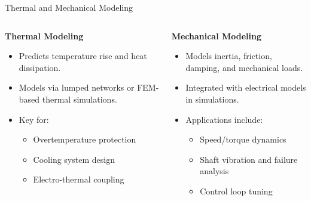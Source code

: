\begin{frame}{Thermal and Mechanical Modeling}
    \begin{columns}
        \begin{column}{0.5\textwidth}
            \textbf{Thermal Modeling}
            \begin{itemize}
                \item Predicts temperature rise and heat dissipation.
                \item Models via lumped networks or FEM-based thermal simulations.
                \item Key for:
                \begin{itemize}
                    \item Overtemperature protection
                    \item Cooling system design
                    \item Electro-thermal coupling
                \end{itemize}
            \end{itemize}
        \end{column}
        \begin{column}{0.5\textwidth}
            \textbf{Mechanical Modeling}
            \begin{itemize}
                \item Models inertia, friction, damping, and mechanical loads.
                \item Integrated with electrical models in simulations.
                \item Applications include:
                \begin{itemize}
                    \item Speed/torque dynamics
                    \item Shaft vibration and failure analysis
                    \item Control loop tuning
                \end{itemize}
            \end{itemize}
        \end{column}
    \end{columns}
\end{frame}

